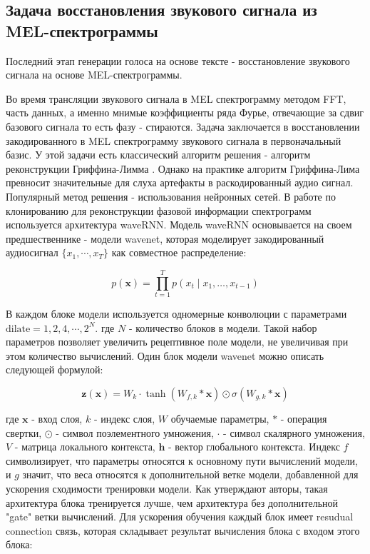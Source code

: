 \documentclass[oneside,final,14pt]{extreport}
\begin{document}
\subsection{Задача восстановления звукового сигнала из MEL-спектрограммы}

Последний этап генерации голоса на основе тексте - восстановление звукового сигнала на основе MEL-спектрограммы. 

Во время трансляции звукового сигнала в MEL спектрограмму методом FFT, часть данных, а именно мнимые коэффициенты ряда Фурье, отвечающие за сдвиг базового сигнала то есть фазу - стираются. Задача заключается в восстановлении закодированного в MEL спектрограмму звукового сигнала в первоначальный базис. У этой задачи есть классический алгоритм решения - алгоритм реконструкции Гриффина-Лимма \cite{bib:phase_estim}.  Однако на практике алгоритм Гриффина-Лима превносит значительные для слуха артефакты в раскодированный аудио сигнал. Популярный метод решения - использования нейронных сетей. В работе по клонированию \cite{bib:voice_cloning} для реконструкции фазовой информации спектрограмм используется архитектура waveRNN\cite{bib:waveRNN}.
Модель waveRNN основывается на своем предшественнике - модели wavenet\cite{bib:wawnet}, которая моделирует закодированный аудиосигнал $\{x_1, \cdots ,x_T\}$ как совместное распределение:  

$$
\begin{equation}
p(\mathbf{x})=\prod_{t=1}^{T} p\left(x_{t} \mid x_{1}, \ldots, x_{t-1}\right)
\end{equation}
$$

В каждом блоке модели используется одномерные конволюции с параметрами $\text{dilate} = 1, 2, 4, \cdots, 2^N$. где $N$ - количество блоков в модели. Такой набор параметров позволяет увеличить рецептивное поле модели, не увеличивая при этом количество вычислений\cite{bib:wavenet}. Один блок модели wavenet можно описать следующей формулой:

$$
\begin{equation}
\mathbf{z}(\mathbf{x})= W_k \cdot\tanh \left(W_{f, k} * \mathbf{x}\right) \odot \sigma\left(W_{g, k} * \mathbf{x}\right)
\end{equation}
$$

где $\mathbf{x}$ - вход слоя, $k$ - индекс слоя, $W$ обучаемые параметры, $*$ - операция свертки, $\odot$ - символ поэлементного умножения, $\cdot$ - символ скалярного умножения, $V$ - матрица локального контекста, $\mathbf{h}$ - вектор глобального контекста. Индекс $f$ символизирует, что параметры относятся к основному пути вычислений модели, и $g$ значит, что веса относятся к дополнительной ветке модели, добавленной для ускорения сходимости тренировки модели. Как утверждают авторы, такая архитектура блока тренируется лучше, чем архитектура без дополнительной "gate" ветки вычислений\cite{bib:wawenet}.  Для ускорения обучения каждый блок имеет resudual connection связь, которая складывает результат вычисления блока с входом этого блока:
\end{document}
